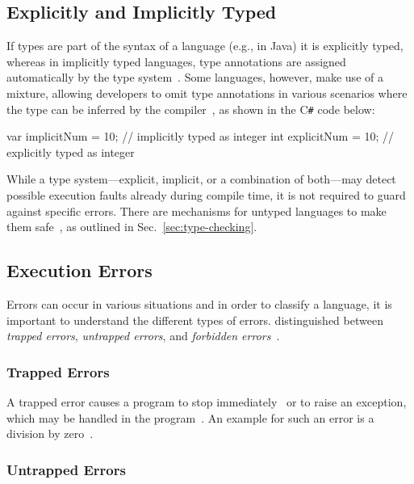 \subsection{Explicitly and Implicitly Typed}
\label{sec:explicitly-implicitly-typed}

If types are part of the syntax of a language (e.g., in Java) it is explicitly typed, whereas in implicitly typed languages, type annotations are assigned automatically by the type system~\cite[pp.~97-2--97-3]{TypeSystems:Cardelli:2004}. Some languages, however, make use of a mixture, allowing developers to omit type annotations in various scenarios where the type can be inferred by the compiler~\cite[p.~10]{TypesAndProgrammingLanguages:Pierce:2002}, as shown in the C\texttt{\#} code below:
\begin{CsCode}[numbers=none]
var implicitNum = 10; // implicitly typed as integer
int explicitNum = 10; // explicitly typed as integer
\end{CsCode}
While a type system---explicit, implicit, or a combination of both---may detect possible execution faults already during compile time, it is not required to guard against specific errors. There are mechanisms for untyped languages to make them safe~\cite[p.~97-3]{TypeSystems:Cardelli:2004}, as outlined in Sec.~\ref{sec:type-checking}.

\subsection{Execution Errors}
\label{sec:execution-errors}

Errors can occur in various situations and in order to classify a language, it is important to understand the different types of errors. \citeauthor{TypeSystems:Cardelli:2004} distinguished between \emph{trapped errors}, \emph{untrapped errors}, and \emph{forbidden errors}~\cite[p.~97-3]{TypeSystems:Cardelli:2004}.

\subsubsection{Trapped Errors}

A trapped error causes a program to stop immediately~\cite[p.~97-3]{TypeSystems:Cardelli:2004} or to raise an exception, which may be handled in the program~\cite[p.~7]{TypesAndProgrammingLanguages:Pierce:2002}. An example for such an error is a division by zero~\cite[p.~97-3]{TypeSystems:Cardelli:2004}.

\subsubsection{Untrapped Errors}

